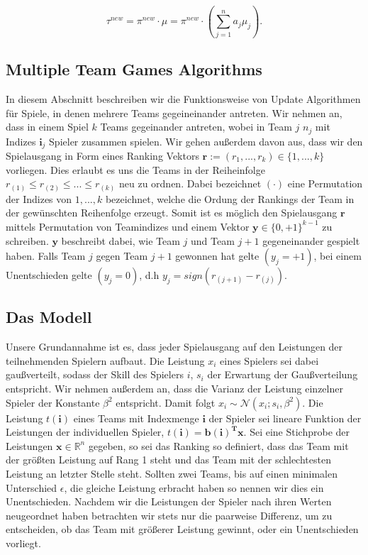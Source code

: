 \documentclass[12pt,a4paper]{scrartcl}
\numberwithin{equation}{section}
\newcommand{\R}{\mathbb{R}} %
\begin{document}
  \begin{equation}
   \tau^{new} = \pi^{new} \cdot \mu = \pi^{new} \cdot (\sum_{j=1}^n a_j \mu_j).
  \end{equation}

  

   
   \subsection{Multiple Team Games Algorithms}
   
   In diesem Abschnitt beschreiben wir die Funktionsweise von Update Algorithmen für Spiele, in denen mehrere 
   Teams gegeineinander antreten. 
   Wir nehmen an, dass in einem Spiel $k$ Teams gegeinander antreten, wobei in Team $j$ $n_j$ mit Indizes $\mathbf{i}_j$ Spieler zusammen
   spielen. Wir gehen außerdem davon aus, dass wir den Spielausgang in Form eines Ranking Vektors
   $\mathbf{r} := (r_1,...,r_k) \in \{1,...,k\}$ vorliegen. Dies erlaubt es uns die Teams in der Reiheinfolge
   $ r_{(1)} \leq r_{(2)} \leq ... \leq r_{(k)}$ neu zu ordnen. Dabei bezeichnet $( \cdot )$ eine Permutation 
   der Indizes von $1,...,k$ bezeichnet, welche die Ordung der Rankings der Team in der gewünschten Reihenfolge
   erzeugt. Somit ist es möglich den Spielausgang $\mathbf{r}$ mittels Permutation von Teamindizes und einem Vektor 
   $\mathbf{y} \in \{0, +1\}^{k-1}$ zu schreiben. $\mathbf{y}$ beschreibt dabei, wie Team $j$ und Team $j+1$ gegeneinander
   gespielt haben. Falls  Team $j$ gegen Team $j+1$ gewonnen hat gelte $(y_j = +1)$, bei einem Unentschieden gelte 
   $(y_j = 0)$, d.h $y_j = sign(r_{(j+1)} - r_{(j)})$.
   
   \subsection{Das Modell}
   
   Unsere Grundannahme ist es, dass jeder Spielausgang auf den Leistungen der teilnehmenden Spielern aufbaut. Die 
   Leistung $x_i$ eines Spielers sei dabei gaußverteilt, sodass der Skill des Spielers $i$, $s_i$ der Erwartung der Gaußverteilung entspricht. 
   Wir nehmen außerdem an, dass die Varianz der Leistung einzelner Spieler der Konstante $\beta^2$ entspricht. Damit folgt $x_i \sim \mathcal{N}(x_i; s_i, \beta^2)$.
   Die Leistung $t(\mathbf{i})$ eines Teams mit Indexmenge $\mathbf{i}$ der Spieler sei lineare Funktion der Leistungen der individuellen Spieler, $t(\mathbf{i}) = \mathbf{b(i)^T x}$.
   Sei eine Stichprobe der Leistungen $\mathbf{x} \in \R^n$ gegeben, so sei das Ranking so definiert, dass das Team mit der größten Leistung auf Rang 1 steht und das Team mit der
   schlechtesten Leistung an letzter Stelle steht. Sollten zwei Teams, bis auf einen minimalen Unterschied $\epsilon$, die gleiche Leistung erbracht haben so nennen wir dies ein Unentschieden.
   Nachdem wir die Leistungen der Spieler nach ihren Werten neugeordnet haben betrachten wir stets nur die paarweise Differenz, um zu entscheiden, ob das Team mit größerer Leistung
   gewinnt, oder ein Unentschieden vorliegt. \\
   
\end{document}
